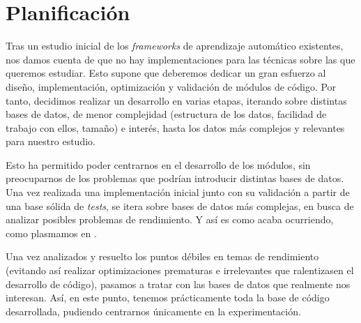 \section{Planificación} \label{isec:planificacion}

Tras un estudio inicial de los \textit{frameworks} de aprendizaje automático existentes, nos damos cuenta de que no hay implementaciones para las técnicas sobre las que queremos estudiar. Esto supone que deberemos dedicar un gran esfuerzo al diseño, implementación, optimización y validación de módulos de código. Por tanto, decidimos realizar un desarrollo en varias etapas, iterando sobre distintas bases de datos, de menor complejidad (estructura de los datos, facilidad de trabajo con ellos, tamaño) e interés, hasta los datos más complejos y relevantes para nuestro estudio.

Esto ha permitido poder centrarnos en el desarrollo de los módulos, sin preocuparnos de los problemas que podrían introducir distintas bases de datos. Una vez realizada una implementación inicial junto con su validación a partir de una base sólida de \textit{tests}, se itera sobre bases de datos más complejas, en busca de analizar posibles problemas de rendimiento. Y así es como acaba ocurriendo, como plasmamos en .

Una vez analizados y resuelto los puntos débiles en temas de rendimiento (evitando así realizar optimizaciones prematuras e irrelevantes que ralentizasen el desarrollo de código), pasamos a tratar con las bases de datos que realmente nos interesan. Así, en este punto, tenemos prácticamente toda la base de código desarrollada, pudiendo centrarnos únicamente en la experimentación.


